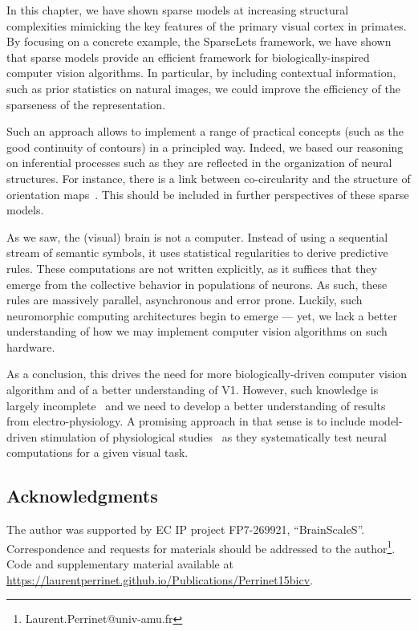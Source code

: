 \documentclass[a4paper, 11pt]{book}
\makeatletter
\newcommand{\Website}{https://laurentperrinet.github.io}%
\newcommand{\Email}{Laurent.Perrinet@univ-amu.fr}%
\newcommand{\Acknowledgments}{%
The author was supported by EC IP project FP7-269921, ``BrainScaleS''.
Correspondence and requests for materials should be addressed to the author\footnote{\Email }.
Code and supplementary material available at \url{\Website/Publications/Perrinet15bicv}. %
}%
\makeatother
\begin{document}
In this chapter, we have shown sparse models at increasing structural complexities mimicking the key features of the primary visual cortex in primates.
By focusing on a concrete example, the SparseLets framework, we have shown that sparse models provide
an efficient framework for biologically-inspired computer vision algorithms.
In particular, by including contextual information, such as prior statistics on natural images, we could improve
the efficiency of the sparseness of the representation.

Such an approach allows to implement a range of practical concepts (such as the good continuity of contours) in a principled way.
Indeed, we based our reasoning on inferential processes such as they are reflected in the organization of neural structures.
For instance, there is a link between co-circularity and the structure of orientation maps~\citep{Hunt09}.
This should be included in further perspectives of these sparse models.

As we saw, the (visual) brain is not a computer.
Instead of using a sequential stream of semantic symbols, it uses statistical regularities to derive predictive rules.
These computations are not written explicitly, as it suffices that they emerge from the collective behavior in populations of neurons.
As such, these rules are massively parallel, asynchronous and error prone.
Luckily, such neuromorphic computing architectures begin to emerge --- yet, we lack a better understanding of how we may implement computer vision algorithms on such hardware.

%
%
As a conclusion, this drives the need for more biologically-driven computer vision algorithm and of a better understanding of V1.
However, such knowledge is largely incomplete~\citep{Olshausen05} and we need to develop a better understanding of results from electro-physiology.
A promising approach in that sense is to include model-driven stimulation of physiological studies~\citep{Leon12,Simoncini12} as they systematically test neural computations for a given visual task.

\subsection*{Acknowledgments} %
\Acknowledgments %
%

\backmatter
\end{document}
